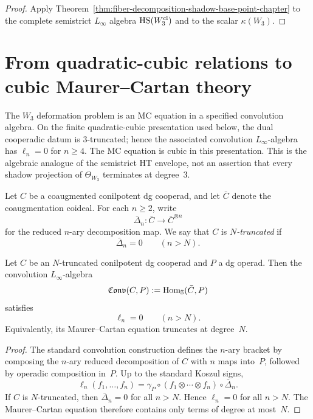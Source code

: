 \begin{proof}
Apply Theorem~\ref{thm:fiber-decomposition-shadow-base-point-chapter} to
the complete semistrict $L_\infty$ algebra $\operatorname{HS}(W_3^{\mathrm{cl}})$ and
to the scalar $\kappa(W_3)$.\qedhere
\end{proof}

\section{From quadratic-cubic relations to cubic Maurer--Cartan theory}
\label{sec:quadratic-cubic-to-cubic-MC}

The $W_3$ deformation problem is an MC equation in a specified
convolution algebra. On the finite quadratic-cubic presentation used
below, the dual cooperadic datum is $3$-truncated; hence the associated
convolution $L_\infty$-algebra has $\ell_n = 0$ for $n \ge 4$. The MC
equation is cubic in this presentation. This is the algebraic analogue
of the semistrict HT envelope, not an assertion that every shadow
projection of $\Theta_{W_3}$ terminates at degree~$3$.

\begin{definition}
\label{def:truncated-cooperad-chapter}
Let $C$ be a coaugmented conilpotent dg cooperad, and let $\bar C$ denote the coaugmentation coideal. For each $n\ge 2$, write
\[
\bar\Delta_n:\bar C\longrightarrow \bar C^{\otimes n}
\]
for the reduced $n$-ary decomposition map. We say that $C$ is \emph{$N$-truncated} if
\[
\bar\Delta_n=0
\qquad
(n>N).
\]
\end{definition}

\begin{theorem}
\label{thm:finite-degree-convolution-chapter}
Let $C$ be an $N$-truncated conilpotent dg cooperad and $P$ a dg operad. Then the convolution $L_\infty$-algebra
\[
\mathfrak{Conv}(C,P):=\operatorname{Hom}_{\mathbb S}(\bar C,P)
\]
satisfies
\[
\ell_n=0
\qquad
(n>N).
\]
Equivalently, its Maurer--Cartan equation truncates at degree~$N$.
\end{theorem}

\begin{proof}
The standard convolution construction defines the $n$-ary bracket by composing the $n$-ary reduced decomposition of $C$ with $n$ maps into~$P$, followed by operadic composition in~$P$. Up to the standard Koszul signs,
\[
\ell_n(f_1,\dots,f_n)
=
\gamma_P\circ(f_1\otimes\cdots\otimes f_n)\circ\bar\Delta_n.
\]
If $C$ is $N$-truncated, then $\bar\Delta_n=0$ for all $n>N$. Hence $\ell_n=0$ for all $n>N$. The Maurer--Cartan equation therefore contains only terms of degree at most~$N$.\qedhere
\end{proof}

